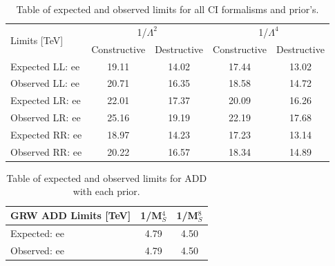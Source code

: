 


    \begin {table}[h]
        \begin{center}
        \begin{tabular}{  l | c | c | c | c  } 
            \hline
            \hline
            \multirow{2}{*}{Limits [TeV]} & \multicolumn{2}{c|}{1/$\Lambda^2$} & \multicolumn{2}{c}{1/$\Lambda^4$} \\
            \cline{2-5}
             & Constructive & Destructive & Constructive & Destructive \\
            \hline
            Expected LL: ee       & 19.11 & 14.02 & 17.44 & 13.02 \\
            Observed LL: ee       & 20.71 & 16.35 & 18.58 & 14.72 \\
            \hline
            Expected LR: ee       & 22.01 & 17.37 & 20.09 & 16.26 \\
            Observed LR: ee       & 25.16 & 19.19 & 22.19 & 17.68 \\
            \hline
            Expected RR: ee       & 18.97 & 14.23 & 17.23 & 13.14 \\
            Observed RR: ee       & 20.22 & 16.57 & 18.34 & 14.89 \\
            \hline
            \hline
        \end{tabular}
        \caption{Table of expected and observed limits for all CI formalisms and prior's.}
        \label{tab:limits_CI}
        \end{center}
    \end {table}


    \begin {table}[h]
        \begin{center}
        \begin{tabular}{ l | c | c } 
            \hline
            \hline
            GRW ADD Limits [TeV] & 1/M$_S^4$ & 1/M$_S^8$ \\
            \hline
            Expected: ee & 4.79 & 4.50 \\
            Observed: ee & 4.79 & 4.50 \\
            \hline
            \hline
        \end{tabular}
        \caption{Table of expected and observed limits for ADD with each prior.}
        \label{tab:limits_ADD}
        \end{center}
    \end {table}


